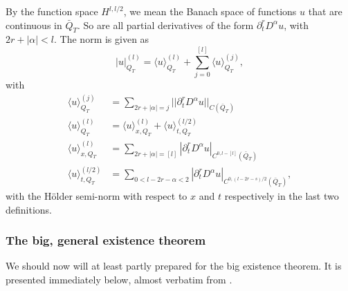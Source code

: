 \documentclass[11pt, a4paper]{article}
\begin{document}
By the function space $H^{l, l/2}$, we mean the Banach space of functions $u$ that are continuous in $\bar{Q}_T$. So are all partial derivatives of the form $\partial_t^r D^\alpha u$, with $2r+|\alpha| <l$. The norm is given as
\begin{equation*}
	|u|_{Q_T}^{(l)} = \langle u \rangle^{(l)}_{Q_T} + \sum_{j=0}^{[l]}\langle u \rangle^{(j)}_{Q_T},
\end{equation*}
with
\begin{align*}
\langle u \rangle^{(j)}_{Q_T} &= \sum_{2r+|\alpha|=j} ||\partial_t^r D^\alpha u||_{C(\bar{Q}_T)} \\
\langle u \rangle^{(l)}_{Q_T} &= \langle u \rangle^{(l)}_{x,Q_T} + \langle u \rangle^{(l/2)}_{t,Q_T} \\
\langle u \rangle^{(l)}_{x,Q_T} &= \sum_{2r+|\alpha|=[l]} |\partial_t^r D^{\alpha}u|_{C^{0,l-[l]}(\bar{Q}_T)} \\
 \langle u \rangle^{(l/2)}_{t,Q_T} &= \sum_{0 < l - 2r -\alpha < 2} |\partial_t^r D^\alpha u|_{C^{0,(l-2r-s)/2}(\bar{Q}_T)},
\end{align*}
with the Hölder semi-norm with respect to $x$ and $t$ respectively in the last two definitions.



\subsubsection{The big, general existence theorem}
We should now will at least partly prepared for the big existence theorem. It is presented immediately below, almost verbatim from \citep[ Theorem 6.1, p. 452]{ladyzhenskaya}.
\end{document}
